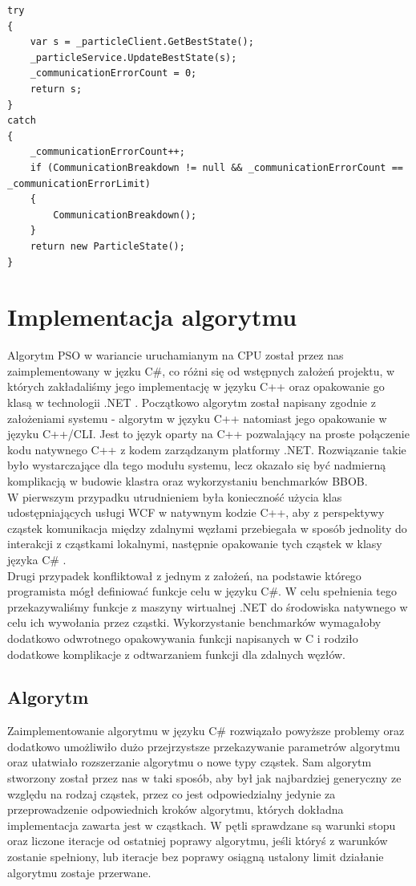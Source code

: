 \documentclass[12pt, twoside, openany, abstract=on]{report}
\theoremstyle{definition}
\begin{document}
\begin{lstlisting}[frame=single]
try
{
	var s = _particleClient.GetBestState();
	_particleService.UpdateBestState(s);
	_communicationErrorCount = 0;
	return s;
}
catch
{
	_communicationErrorCount++;
	if (CommunicationBreakdown != null && _communicationErrorCount == 						_communicationErrorLimit)
	{
		CommunicationBreakdown();		
	}
	return new ParticleState();
}
\end{lstlisting}

\section{Implementacja algorytmu}
Algorytm PSO w wariancie uruchamianym na CPU został przez nas zaimplementowany w jęzku C\#, co różni się od wstępnych założeń projektu, w których zakładaliśmy jego implementację w języku C++ oraz opakowanie go klasą w technologii .NET . Początkowo algorytm został napisany zgodnie z założeniami systemu - algorytm w języku C++ natomiast jego opakowanie w języku C++/CLI. Jest to język oparty na C++ pozwalający na proste połączenie kodu natywnego C++ z kodem zarządzanym platformy .NET. Rozwiązanie takie było wystarczające dla tego modułu systemu, lecz okazało się być nadmierną komplikacją w budowie klastra oraz wykorzystaniu benchmarków BBOB.\\
W pierwszym przypadku utrudnieniem była konieczność użycia klas udostępniających usługi WCF w natywnym kodzie C++, aby  z perspektywy cząstek komunikacja między zdalnymi węzłami przebiegała w sposób jednolity do interakcji z cząstkami lokalnymi, następnie opakowanie tych cząstek w klasy języka C\# .\\
Drugi przypadek konfliktował z jednym z założeń, na podstawie którego programista mógł definiować funkcje celu w języku C\#. W celu spełnienia tego przekazywaliśmy funkcje z maszyny wirtualnej .NET do środowiska natywnego w celu ich wywołania przez cząstki. Wykorzystanie benchmarków wymagałoby dodatkowo odwrotnego opakowywania funkcji napisanych w C i rodziło dodatkowe komplikacje z odtwarzaniem funkcji dla zdalnych węzłów.

\subsection{Algorytm}
Zaimplementowanie algorytmu w języku C\# rozwiązało powyższe problemy oraz dodatkowo umożliwiło dużo przejrzystsze przekazywanie parametrów algorytmu oraz ułatwiało rozszerzanie algorytmu o nowe typy cząstek.
Sam algorytm stworzony został przez nas w taki sposób, aby był jak najbardziej generyczny ze względu na rodzaj cząstek, przez co jest odpowiedzialny jedynie za przeprowadzenie odpowiednich kroków algorytmu, których dokładna implementacja zawarta jest w cząstkach. W pętli sprawdzane są warunki stopu oraz liczone iteracje od ostatniej poprawy algorytmu, jeśli któryś z warunków zostanie spełniony, lub iteracje bez poprawy osiągną ustalony limit działanie algorytmu zostaje przerwane.
\end{document}
